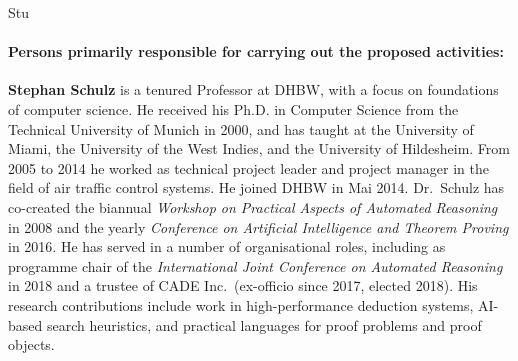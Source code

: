 \begin{sitedescription}{Stu}
\paragraph*{Persons primarily responsible for carrying out the proposed activities:}

\begin{compactitem}
\item
\textbf{Stephan Schulz} is a tenured Professor at DHBW, with a focus
on foundations of computer science. He received his Ph.D. in Computer
Science from the Technical University of Munich in 2000, and has
taught at the University of Miami, the University of the West Indies,
and the University of Hildesheim. From 2005 to 2014 he worked as
technical project leader and project manager in the field of air
traffic control systems. He joined DHBW in Mai 2014. Dr.\ Schulz has
co-created the biannual \emph{Workshop on Practical Aspects of
  Automated Reasoning} in 2008 and the yearly \emph{Conference on
  Artificial Intelligence and Theorem Proving} in 2016. He has served
in a number of organisational roles, including as programme chair of the
\emph{International Joint Conference on Automated Reasoning} in 2018
and a trustee of CADE Inc.\ (ex-officio since 2017, elected 2018). His
research contributions include work in high-performance deduction
systems, AI-based search heuristics, and practical languages for proof
problems and proof objects.
\end{compactitem}

\end{sitedescription}

